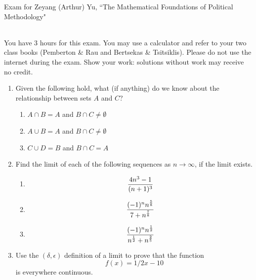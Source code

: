 \documentclass[11pt]{article}
\begin{document}
\noindent \large Exam for Zeyang (Arthur) Yu, ``The Mathematical Foundations of Political Methodology"

\normalsize
\ \\You have 3 hours for this exam.  You may use a calculator and refer to your two class books (Pemberton \& Rau  and Bertsekas \& Tsitsiklis).  Please do not use the internet during the exam.  Show your work: solutions without work may receive no credit.

\begin{enumerate}

\item Given the following hold, what (if anything) do we know about the relationship between sets $A$ and $C$?

\begin{enumerate}
\item $A\cap B= A$ and $B\cap C\not=\emptyset$
\item $A\cup B= A$ and $B\cap C\not=\emptyset$
\item $C \cup D=B$ and $B\cap C=A$

\end{enumerate}

\vspace{.2in}

\item Find the limit of each of the following sequences as $n\rightarrow \infty$, if the limit exists.
\begin{enumerate}
\item $${{4n^3-1}\over{(n+1)^3}}$$
\item $${{(-1)^n n^{5\over 8}}\over{7+n^{7\over 8}}}$$
\item $${{(-1)^n n^{1\over 2}}\over{n^{1\over 2}+n^{2\over 5}}}$$
\end{enumerate}

\vspace{.2in}

\item Use the $(\delta, \epsilon)$ definition of a limit to prove that the function $$f(x)={1/2}x-10$$ is everywhere continuous.



\end{enumerate}
\end{document}
